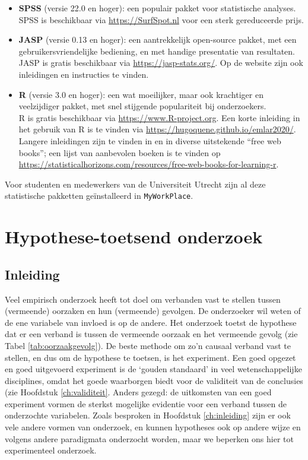 \documentclass[
]{book}
\begin{document}
\begin{itemize}
\item
  \textbf{SPSS} (versie 22.0 en hoger): een populair pakket voor statistische analyses.\\
  SPSS is beschikbaar via \url{https://SurfSpot.nl} voor een sterk gereduceerde prijs.
\item
  \textbf{JASP} (versie 0.13 en hoger): een aantrekkelijk open-source pakket, met een gebruikersvriendelijke bediening, en met handige presentatie van resultaten.\\
  JASP is gratis beschikbaar via \url{https://jasp-stats.org/}. Op de website zijn ook inleidingen en instructies te vinden.
\item
  \textbf{R} (versie 3.0 en hoger): een wat moeilijker, maar ook krachtiger en veelzijdiger pakket, met snel stijgende populariteit bij onderzoekers.\\
  R is gratis beschikbaar via \url{https://www.R-project.org}.
  Een korte inleiding in het gebruik van R is te vinden via \url{https://hugoquene.github.io/emlar2020/}.
  Langere inleidingen zijn te vinden in \citet{Dalg02} en in diverse uitstekende ``free web books''; een lijst van aanbevolen boeken is te vinden op \url{https://statisticalhorizons.com/resources/free-web-books-for-learning-r}.
\end{itemize}

Voor studenten en medewerkers van de Universiteit Utrecht zijn al deze statistische pakketten geïnstalleerd in \texttt{MyWorkPlace}.

\hypertarget{ch:onderzoek}{%
\chapter{Hypothese-toetsend onderzoek}\label{ch:onderzoek}}

\hypertarget{inleiding}{%
\section{Inleiding}\label{inleiding}}

Veel empirisch onderzoek heeft tot doel om verbanden vast te stellen
tussen (vermeende) oorzaken en hun (vermeende) gevolgen. De onderzoeker
wil weten of de ene variabele van invloed is op de andere. Het onderzoek
toetst de hypothese dat er een verband is tussen de vermeende oorzaak en
het vermeende gevolg (zie Tabel \ref{tab:oorzaakgevolg}).
De beste methode om zo'n causaal verband vast
te stellen, en dus om de hypothese te toetsen, is het experiment. Een
goed opgezet en goed uitgevoerd experiment is de `gouden standaard' in
veel wetenschappelijke disciplines, omdat het goede waarborgen biedt
voor de validiteit van de conclusies (zie
Hoofdstuk \ref{ch:validiteit}.
Anders gezegd: de uitkomsten van een goed
experiment vormen de sterkst mogelijke evidentie voor een verband tussen
de onderzochte variabelen. Zoals besproken in
Hoofdstuk \ref{ch:inleiding} zijn er ook vele andere vormen van onderzoek,
en kunnen hypotheses ook op andere wijze en volgens andere paradigmata
onderzocht worden, maar we beperken ons hier tot experimenteel
onderzoek.
\end{document}
